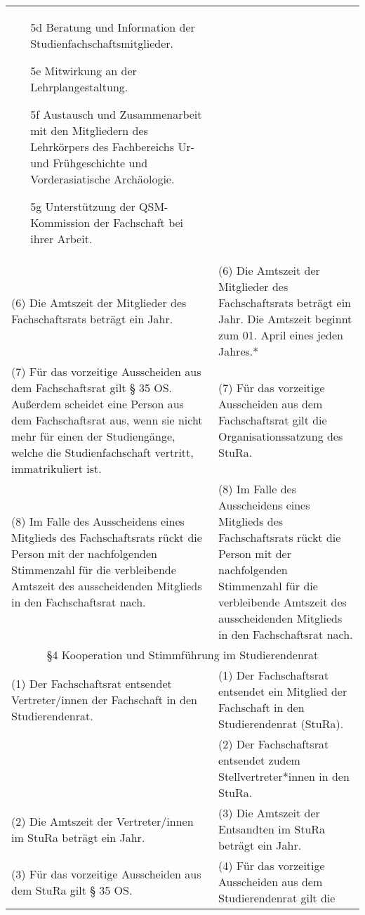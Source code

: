 {\begin{longtable}{|p{7.5cm}|p{7.5cm}|}
\begin{itemize}
        \item[5d]Beratung und Information der Studienfachschaftsmitglieder.
        \item[5e]Mitwirkung an der Lehrplangestaltung.
        \item[5f]Austausch und Zusammenarbeit mit den Mitgliedern des Lehrkörpers des Fachbereichs Ur- und Frühgeschichte und Vorderasiatische Archäologie.    
        \item[5g]Unterstützung der QSM-Kommission der Fachschaft bei ihrer Arbeit. 
        \end{itemize}\\
        (6)  Die Amtszeit der Mitglieder des Fachschaftsrats beträgt ein Jahr.&(6)  Die Amtszeit der Mitglieder des Fachschaftsrats beträgt ein Jahr. Die Amtszeit
        beginnt zum 01. April eines jeden Jahres.*\\
        (7)  Für das vorzeitige Ausscheiden aus dem Fachschaftsrat gilt § 35 OS. Außerdem
        scheidet eine Person aus dem Fachschaftsrat aus, wenn sie nicht mehr für einen der
        Studiengänge, welche die Studienfachschaft vertritt, immatrikuliert ist.&(7)  Für das vorzeitige Ausscheiden aus dem Fachschaftsrat gilt die
        Organisationssatzung des StuRa.\\
        (8) Im Falle des Ausscheidens eines Mitglieds des Fachschaftsrats rückt die Person
        mit der nachfolgenden Stimmenzahl für die verbleibende Amtszeit des ausscheidenden
        Mitglieds in den Fachschaftsrat nach.&(8) Im Falle des Ausscheidens eines Mitglieds des Fachschaftsrats rückt die Person
        mit der nachfolgenden Stimmenzahl für die verbleibende Amtszeit des ausscheidenden
        Mitglieds in den Fachschaftsrat nach.\\
        \multicolumn{2}{|c|}{§4 Kooperation und Stimmführung im Studierendenrat}\\\hline
        (1)  Der Fachschaftsrat entsendet Vertreter/innen der Fachschaft in den
        Studierendenrat.&(1)  Der Fachschaftsrat entsendet ein Mitglied der Fachschaft in den Studierendenrat
        (StuRa).\\
        &(2) Der Fachschaftsrat entsendet zudem Stellvertreter*innen in den StuRa. \\
        (2)  Die Amtszeit der Vertreter/innen im StuRa beträgt ein Jahr.& (3)  Die Amtszeit der Entsandten im StuRa beträgt ein Jahr.\\
        (3)  Für das vorzeitige Ausscheiden aus dem StuRa gilt § 35 OS. & (4)  Für das vorzeitige Ausscheiden aus dem Studierendenrat gilt die

\end{longtable}}
